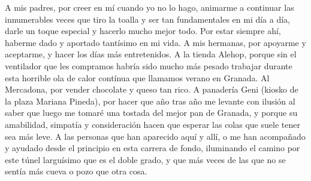 A mis padres, por creer en mí cuando yo no lo hago, animarme a continuar las innumerables veces que tiro la 
toalla y ser tan fundamentales en mi día a día, darle un toque especial y hacerlo mucho mejor todo. Por estar 
siempre ahí, haberme dado y aportado tantísimo en mi vida. A mis hermanas, por apoyarme y aceptarme, y hacer los 
días más entretenidos. A la tienda Alehop, porque sin el ventilador que les compramos habría sido mucho 
más pesado trabajar durante esta horrible ola de calor contínua que llamamos verano en Granada. Al Mercadona, 
por vender chocolate y queso tan rico. A panadería Geni (kiosko de la plaza Mariana Pineda), por hacer que año tras 
año me levante con ilusión al saber que luego me tomaré una tostada del mejor pan de Granada, y porque su 
amabilidad, simpatía y consideración hacen que esperar las colas que suele tener sea más leve. A las personas 
que han aparecido aquí y allí, o me han acompañado y ayudado desde el principio en esta carrera de fondo, 
iluminando el camino por este túnel larguísimo que es el doble grado, y que más veces de las que no se 
sentía más cueva o pozo que otra cosa. 


